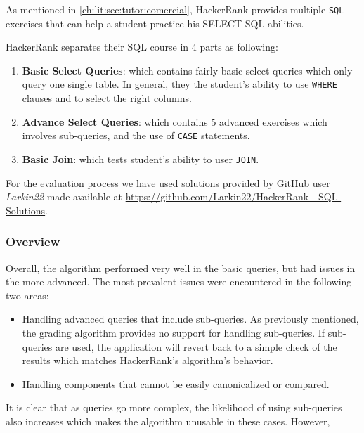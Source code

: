 As mentioned in \ref{ch:lit:sec:tutor:comercial}, HackerRank provides multiple \texttt{SQL} exercises that can help a student practice his SELECT SQL abilities.



HackerRank separates their SQL course in 4 parts as following:
\begin{enumerate}
    \item \textbf{Basic Select Queries}: which contains fairly basic select queries which only query one single table. In general, they the student's ability to use \texttt{WHERE} clauses and to select the right columns.
    \item \textbf{Advance Select Queries}: which contains 5 advanced exercises which involves sub-queries, and the use of \texttt{CASE} statements.
    \item \textbf{Basic Join}: which tests student's ability to user \texttt{JOIN}.
\end{enumerate}

For the evaluation process we have used solutions provided by GitHub user \textit{Larkin22} made available at \url{https://github.com/Larkin22/HackerRank---SQL-Solutions}.

\subsubsection{Overview}

Overall, the algorithm performed very well in the basic queries, but had issues in the more advanced. The most prevalent issues were encountered in the following two areas:
\begin{itemize}
    \item Handling advanced queries that include sub-queries. As previously mentioned, the grading algorithm provides no support for handling sub-queries. If sub-queries are used, the application will revert back to a simple check of the results which matches HackerRank's algorithm's behavior.
    \item Handling components that cannot be easily canonicalized or compared.
\end{itemize}

It is clear that as queries go more complex, the likelihood of using sub-queries also increases which makes the algorithm unusable in these cases. However,

\subsection{}